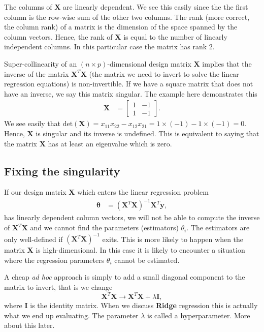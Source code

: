 \documentclass[%
oneside,                 %
final,                   %
10pt]{article}
\begin{document}
The columns of $\bm{X}$ are linearly dependent. We see this easily since the 
the first column is the row-wise sum of the other two columns. The rank (more correct,
the column rank) of a matrix is the dimension of the space spanned by the
column vectors. Hence, the rank of $\mathbf{X}$ is equal to the number
of linearly independent columns. In this particular case the matrix has rank 2.

Super-collinearity of an $(n \times p)$-dimensional design matrix $\mathbf{X}$ implies
that the inverse of the matrix $\bm{X}^T\bm{X}$ (the matrix we need to invert to solve the linear regression equations) is non-invertible. If we have a square matrix that does not have an inverse, we say this matrix singular. The example here demonstrates this
\begin{align*}
\bm{X} & =  \left[
\begin{array}{rr}
1 & -1
\\
1 & -1
\end{array} \right].
\end{align*}
We see easily that  $\mbox{det}(\bm{X}) = x_{11} x_{22} - x_{12} x_{21} = 1 \times (-1) - 1 \times (-1) = 0$. Hence, $\mathbf{X}$ is singular and its inverse is undefined.
This is equivalent to saying that the matrix $\bm{X}$ has at least an eigenvalue which is zero.

\subsection*{Fixing the singularity}

If our design matrix $\bm{X}$ which enters the linear regression problem
\begin{align}
\bm{\theta} & =  (\bm{X}^{T} \bm{X})^{-1} \bm{X}^{T} \bm{y},
\end{align}
has linearly dependent column vectors, we will not be able to compute the inverse
of $\bm{X}^T\bm{X}$ and we cannot find the parameters (estimators) $\theta_i$. 
The estimators are only well-defined if $(\bm{X}^{T}\bm{X})^{-1}$ exits. 
This is more likely to happen when the matrix $\bm{X}$ is high-dimensional. In this case it is likely to encounter a situation where 
the regression parameters $\theta_i$ cannot be estimated.

A cheap  \emph{ad hoc} approach is  simply to add a small diagonal component to the matrix to invert, that is we change
\[
\bm{X}^{T} \bm{X} \rightarrow \bm{X}^{T} \bm{X}+\lambda \bm{I},
\]
where $\bm{I}$ is the identity matrix.  When we discuss \textbf{Ridge} regression this is actually what we end up evaluating. The parameter $\lambda$ is called a hyperparameter. More about this later. 
\end{document}

